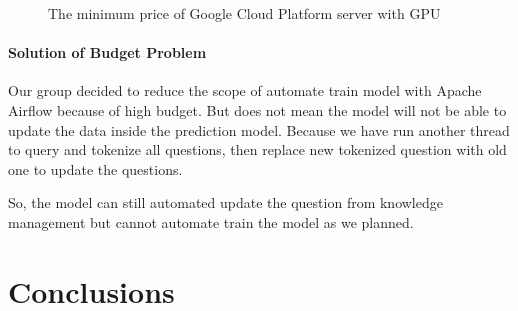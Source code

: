 \documentclass[12pt,oneside,openright,a4paper]{cpe-english-project}
\begin{document}
\begin{figure}[!h]\centering
{}
\caption{The minimum price of Google Cloud Platform server with GPU}
\label{fig:min_gcp_price}
\end{figure}

\subsubsection{Solution of Budget Problem}
Our group decided to reduce the scope of automate train model with Apache Airflow because of high budget.
But does not mean the model will not be able to update the data inside the prediction model.
Because we have run another thread to query and tokenize all questions,
then replace new tokenized question with old one to update the questions.

So, the model can still automated update the question from knowledge management
but cannot automate train the model as we planned.


\chapter{Conclusions}
\end{document}
